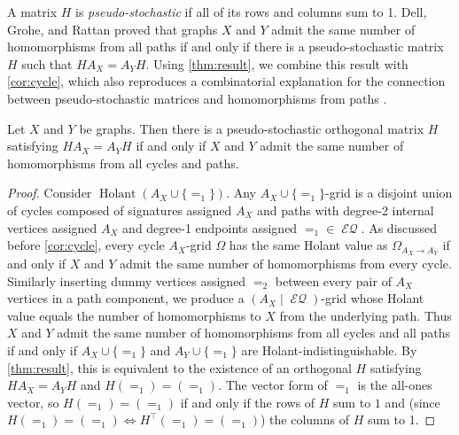 \documentclass{theoretics}
\DeclareMathOperator{\holant}{Holant}
\DeclareMathOperator{\eq}{\mathcal{EQ}}
\begin{document}
A matrix $H$ is \emph{pseudo-stochastic} if all of its rows and columns sum to 1. Dell, Grohe, and
Rattan \cite{dell} proved that graphs $X$ and $Y$ admit the same number of homomorphisms from all
paths if and only if there is a pseudo-stochastic matrix $H$ such that $HA_X = A_YH$. 
Using \autoref{thm:result}, we combine this result with \autoref{cor:cycle}, which also
reproduces a combinatorial explanation 
for the connection between pseudo-stochastic matrices and homomorphisms from paths 
\cite{grohe_homomorphism_2022}.
\begin{corollary}
    Let $X$ and $Y$ be graphs. Then there is a pseudo-stochastic orthogonal matrix $H$ satisfying 
    $H A_X = A_Y H$
    if and only if $X$ and $Y$ admit the same number of homomorphisms from all cycles and paths.
\end{corollary}
\begin{proof}
    Consider $\holant(A_X \cup \{=_1\})$. Any $A_X\cup \{=_1\}$-grid is a disjoint union of 
    cycles composed of signatures assigned $A_X$ and
    paths with degree-2 internal vertices assigned $A_X$ and degree-1 endpoints
    assigned $=_1 \in \eq$. As discussed before
    \autoref{cor:cycle}, every cycle $A_X$-grid $\Omega$ has the same Holant value as
    $\Omega_{A_X \to A_Y}$ if and only if $X$ and $Y$ admit the same
    number of homomorphisms from every cycle. Similarly inserting dummy vertices assigned $=_2$ between
    every pair of $A_X$ vertices in a path component, we produce
    a $(A_X \mid \eq)$-grid whose Holant value equals the number of homomorphisms to $X$ from the
    underlying path.
    Thus $X$ and $Y$ admit the same number of homomorphisms from all cycles and all paths
    if and only if $A_X \cup \{=_1\}$ and $A_Y \cup \{=_1\}$ are Holant-indistinguishable.
    By \autoref{thm:result}, this is equivalent to the existence of an orthogonal $H$ satisfying 
    $H A_X = A_Y H$ and $H (=_1) = (=_1)$.
    The vector form of $=_1$ is the all-ones vector, so $H (=_1) = (=_1)$ if and only if the rows
    of $H$ sum to $1$ and (since $H(=_1) = (=_1) \iff H^\top(=_1) = (=_1)$) the columns of $H$
    sum to 1.
\end{proof}
\end{document}
